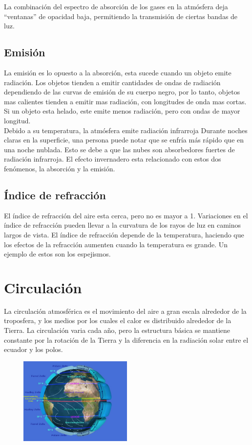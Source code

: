 \documentclass{article} %
\begin{document}
La combinación del espectro de absorción de los gases en la atmósfera deja “ventanas” de opacidad baja, permitiendo la transmisión de ciertas bandas de luz.

\subsection{Emisión}
La emisión es lo opuesto a la absorción, esta sucede cuando un objeto emite radiación. Los objetos tienden a emitir cantidades de ondas de radiación dependiendo de las curvas de emisión de su cuerpo negro, por lo tanto, objetos mas calientes tienden a emitir mas radiación, con longitudes de onda mas cortas. Si un objeto esta helado, este emite menos radiación, pero con ondas de mayor longitud.\\

Debido a su temperatura, la atmósfera emite radiación infrarroja Durante noches claras en la superficie, una persona puede notar que se enfría más rápido que en una noche nublada. Esto se debe a que las nubes son absorbedores fuertes de radiación infrarroja. El efecto invernadero esta relacionado con estos dos fenómenos, la absorción y la emisión.

\subsection{Índice de refracción}
El índice de refracción del aire esta cerca, pero no es mayor a 1. Variaciones en el índice de refracción pueden llevar a la curvatura de los rayos de luz en caminos largos de vista. El índice de refracción depende de la temperatura, haciendo que los efectos de la refracción aumenten cuando la temperatura es grande. Un ejemplo de estos son los espejismos.

\section{Circulación}
La circulación atmosférica es el movimiento del aire a gran escala alrededor de la troposfera, y los medios por los cuales el calor es distribuido alrededor de la Tierra. La circulación varia cada año, pero la estructura básica se mantiene constante por la rotación de la Tierra y la diferencia en la radiación solar entre el ecuador y los polos.

\begin{figure}[h!]
  \centering
    \includegraphics[width=0.5\textwidth]{circulacion.jpg}
\end{figure}
\end{document}
